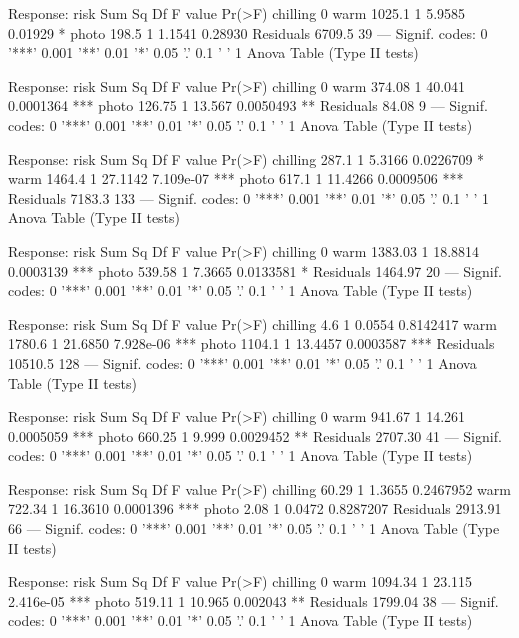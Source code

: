\documentclass{article}\usepackage[]{graphicx}\usepackage[]{color}
\begin{document}
Response: risk
          Sum Sq Df F value  Pr(>F)  
chilling          0                  
warm      1025.1  1  5.9585 0.01929 *
photo      198.5  1  1.1541 0.28930  
Residuals 6709.5 39                  
---
Signif. codes:  0 '***' 0.001 '**' 0.01 '*' 0.05 '.' 0.1 ' ' 1
Anova Table (Type II tests)

Response: risk
          Sum Sq Df F value    Pr(>F)    
chilling          0                      
warm      374.08  1  40.041 0.0001364 ***
photo     126.75  1  13.567 0.0050493 ** 
Residuals  84.08  9                      
---
Signif. codes:  0 '***' 0.001 '**' 0.01 '*' 0.05 '.' 0.1 ' ' 1
Anova Table (Type II tests)

Response: risk
          Sum Sq  Df F value    Pr(>F)    
chilling   287.1   1  5.3166 0.0226709 *  
warm      1464.4   1 27.1142 7.109e-07 ***
photo      617.1   1 11.4266 0.0009506 ***
Residuals 7183.3 133                      
---
Signif. codes:  0 '***' 0.001 '**' 0.01 '*' 0.05 '.' 0.1 ' ' 1
Anova Table (Type II tests)

Response: risk
           Sum Sq Df F value    Pr(>F)    
chilling           0                      
warm      1383.03  1 18.8814 0.0003139 ***
photo      539.58  1  7.3665 0.0133581 *  
Residuals 1464.97 20                      
---
Signif. codes:  0 '***' 0.001 '**' 0.01 '*' 0.05 '.' 0.1 ' ' 1
Anova Table (Type II tests)

Response: risk
           Sum Sq  Df F value    Pr(>F)    
chilling      4.6   1  0.0554 0.8142417    
warm       1780.6   1 21.6850 7.928e-06 ***
photo      1104.1   1 13.4457 0.0003587 ***
Residuals 10510.5 128                      
---
Signif. codes:  0 '***' 0.001 '**' 0.01 '*' 0.05 '.' 0.1 ' ' 1
Anova Table (Type II tests)

Response: risk
           Sum Sq Df F value    Pr(>F)    
chilling           0                      
warm       941.67  1  14.261 0.0005059 ***
photo      660.25  1   9.999 0.0029452 ** 
Residuals 2707.30 41                      
---
Signif. codes:  0 '***' 0.001 '**' 0.01 '*' 0.05 '.' 0.1 ' ' 1
Anova Table (Type II tests)

Response: risk
           Sum Sq Df F value    Pr(>F)    
chilling    60.29  1  1.3655 0.2467952    
warm       722.34  1 16.3610 0.0001396 ***
photo        2.08  1  0.0472 0.8287207    
Residuals 2913.91 66                      
---
Signif. codes:  0 '***' 0.001 '**' 0.01 '*' 0.05 '.' 0.1 ' ' 1
Anova Table (Type II tests)

Response: risk
           Sum Sq Df F value    Pr(>F)    
chilling           0                      
warm      1094.34  1  23.115 2.416e-05 ***
photo      519.11  1  10.965  0.002043 ** 
Residuals 1799.04 38                      
---
Signif. codes:  0 '***' 0.001 '**' 0.01 '*' 0.05 '.' 0.1 ' ' 1
Anova Table (Type II tests)
\end{document}
